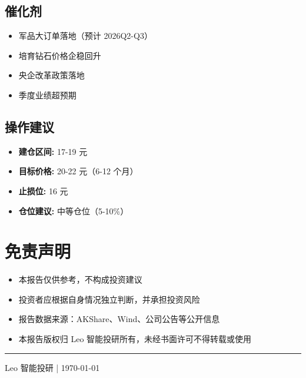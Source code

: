 \documentclass[a4paper,11pt]{article}
\begin{document}
\subsection*{催化剂}
\begin{itemize}[leftmargin=*]
    \item 军品大订单落地（预计 2026Q2-Q3）
    \item 培育钻石价格企稳回升
    \item 央企改革政策落地
    \item 季度业绩超预期
\end{itemize}

\subsection*{操作建议}
\begin{itemize}[leftmargin=*]
    \item \textbf{建仓区间:} 17-19 元
    \item \textbf{目标价格:} 20-22 元（6-12 个月）
    \item \textbf{止损位:} 16 元
    \item \textbf{仓位建议:} 中等仓位（5-10\%）
\end{itemize}

\newpage

\section*{免责声明}

\begin{itemize}[leftmargin=*]
    \item 本报告仅供参考，不构成投资建议
    \item 投资者应根据自身情况独立判断，并承担投资风险
    \item 报告数据来源：AKShare、Wind、公司公告等公开信息
    \item 本报告版权归 Leo 智能投研所有，未经书面许可不得转载或使用
\end{itemize}

\vspace{1cm}

\begin{center}
    \rule{0.8\textwidth}{0.4pt}
    \vspace{0.3cm}
    {\small Leo 智能投研 | \today}
\end{center}
\end{document}
